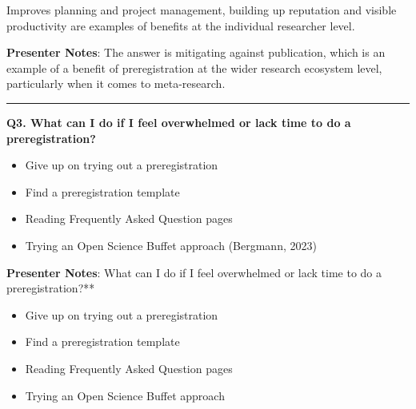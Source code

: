 \documentclass[
  letterpaper,
  DIV=11,
  numbers=noendperiod]{scrartcl}
\providecommand{\tightlist}{%
  \setlength{\itemsep}{0pt}\setlength{\parskip}{0pt}}
\begin{document}
\begin{tcolorbox}[enhanced jigsaw, arc=.35mm, bottomrule=.15mm, bottomtitle=1mm, breakable, colback=white, colbacktitle=quarto-callout-note-color!10!white, colframe=quarto-callout-note-color-frame, coltitle=black, left=2mm, leftrule=.75mm, opacityback=0, opacitybacktitle=0.6, rightrule=.15mm, title=\textcolor{quarto-callout-note-color}{\faInfo}\hspace{0.5em}{Reflecting on answer}, titlerule=0mm, toprule=.15mm, toptitle=1mm]

Improves planning and project management, building up reputation and
visible productivity are examples of benefits at the individual
researcher level.

\end{tcolorbox}

\textbf{Presenter Notes}: The answer is mitigating against publication,
which is an example of a benefit of preregistration at the wider
research ecosystem level, particularly when it comes to meta-research.

\begin{center}\rule{0.5\linewidth}{0.5pt}\end{center}

\textbf{Q3. What can I do if I feel overwhelmed or lack time to do a
preregistration?}

\begin{itemize}
\tightlist
\item[$\square$]
  Give up on trying out a preregistration
\item[$\square$]
  Find a preregistration template
\item[$\square$]
  Reading Frequently Asked Question pages
\item[$\square$]
  Trying an Open Science Buffet approach (Bergmann, 2023)
\end{itemize}

\textbf{Presenter Notes}: What can I do if I feel overwhelmed or lack
time to do a preregistration?**

\begin{itemize}
\tightlist
\item[$\square$]
  Give up on trying out a preregistration
\item[$\square$]
  Find a preregistration template
\item[$\square$]
  Reading Frequently Asked Question pages
\item[$\square$]
  Trying an Open Science Buffet approach
\end{itemize}
\end{document}
